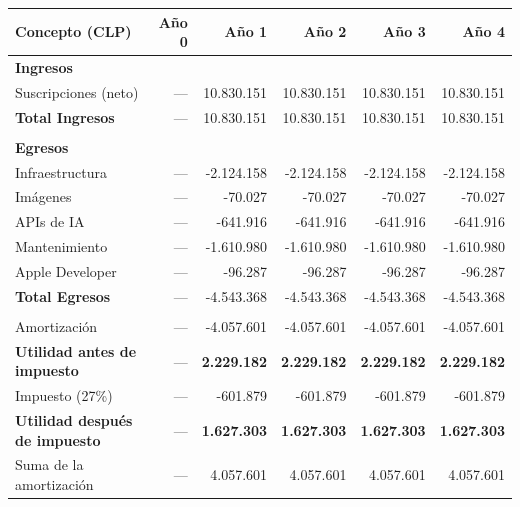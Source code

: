 \begin{table}[h!]
    \centering
    \renewcommand{\arraystretch}{1.3}
    \footnotesize
    \begin{tabular}{|m{3.2cm}|r|r|r|r|r|}
        \hline
        \rowcolor[HTML]{EFEFEF}
        \textbf{Concepto (CLP)} & \textbf{Año 0} & \textbf{Año 1} & \textbf{Año 2} & \textbf{Año 3} & \textbf{Año 4} \\ \hline
        
        \textbf{Ingresos } &&&&&\\ \hline
        Suscripciones (neto) & --- & 10.830.151 & 10.830.151 & 10.830.151 & 10.830.151 \\ \hline
        \rowcolor[HTML]{E8F5E9}
        \textbf{Total Ingresos} & --- & 10.830.151 & 10.830.151 & 10.830.151 & 10.830.151 \\ \hline
        & & & & & \\ \hline
        \textbf{Egresos} & & & & & \\ \hline
        Infraestructura & --- & -2.124.158 & -2.124.158 & -2.124.158 & -2.124.158 \\ \hline
        Imágenes & --- & -70.027 & -70.027 & -70.027 & -70.027 \\ \hline
        APIs de IA & --- & -641.916 & -641.916 & -641.916 & -641.916 \\ \hline
        Mantenimiento & --- & -1.610.980 & -1.610.980 & -1.610.980 & -1.610.980 \\ \hline
        Apple Developer & --- & -96.287 & -96.287 & -96.287 & -96.287 \\ \hline
        \rowcolor[HTML]{F3E5F5}
        \textbf{Total Egresos} & --- & -4.543.368 & -4.543.368 & -4.543.368 & -4.543.368 \\ \hline
        & & & & & \\ \hline
        Amortización & --- & -4.057.601 & -4.057.601 & -4.057.601 & -4.057.601 \\ \hline
        \textbf{Utilidad antes de impuesto} & --- & \textbf{2.229.182} & \textbf{2.229.182} & \textbf{2.229.182} & \textbf{2.229.182} \\ \hline
        Impuesto (27\%) & --- & -601.879 & -601.879 & -601.879 & -601.879 \\ \hline
        \textbf{Utilidad después de impuesto} & --- & \textbf{1.627.303} & \textbf{1.627.303} & \textbf{1.627.303} & \textbf{1.627.303} \\ \hline
        Suma de la amortización & --- & 4.057.601 & 4.057.601 & 4.057.601 & 4.057.601 \\ \hline

\end{tabular}
\end{table}
